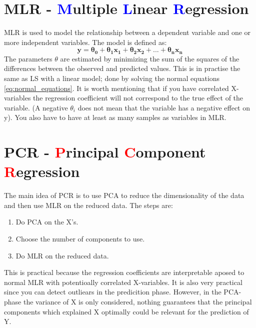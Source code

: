 \section{MLR - \textcolor{blue}{M}ultiple \textcolor{blue}{L}inear \textcolor{blue}{R}egression}
MLR is used to model the relationship between a dependent variable and one or more independent variables. The model is defined as:
\begin{equation}
    \mathbf{
    y = \theta_0 + \theta_1x_1 + \theta_2x_2 + ... + \theta_nx_n
    }
\end{equation}
The parameters $\theta$ are estimated by minimizing the sum of the squares of the differences between the observed and predicted values. This is in practise the same as LS with a linear model; done by solving the normal equations \ref{eq:normal_equations}.
It is worth mentioning that if you have correlated X-variables the regression coefficient will not correspond to the true effect of the variable. (A negative $\theta_i$ does not mean that the variable has a negative effect on  y). You also have to have at least as many samples as variables in MLR. \newline


\section{PCR - \textcolor{red}{P}rincipal \textcolor{red}{C}omponent \textcolor{red}{R}egression}
The main idea of PCR is to use PCA to reduce the dimensionality of the data and then use MLR on the reduced data. The steps are:
\begin{enumerate}
    \item Do PCA on the X's.
    \item Choose the number of components to use.
    \item Do MLR on the reduced data.
\end{enumerate}
This is practical because the regression coefficients are interpretable aposed to normal MLR with potentioally correlated X-variables. It is also very practical since you can detect outliears in the predicition phase. However, in the PCA-phase the variance of X is only considered, nothing guarantees that the principal components which explained X
optimally could be relevant for the prediction of Y. \newline

